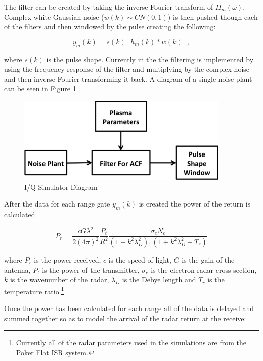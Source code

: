 \documentclass[10pt]{report}
\begin{document}
\noindent The filter can be created by taking the inverse Fourier transform of $H_m(\omega)$.  Complex white Gaussian noise  ($w(k)\sim CN(0,1)$) is then pushed though each of the filters and then windowed by the pulse creating the following:   

\begin{equation}
\label{eq2}
y_m (k)= s(k)\left[h_m(k)*w(k)\right],
\end{equation}
 
\noindent where $s(k)$ is the pulse shape.  Currently in the the filtering is implemented by using the frequency response of the filter and multiplying by the complex noise and then inverse Fourier transforming it back.  A diagram of a single noise plant can be seen in Figure \ref{fig:singlefilt}

\begin{figure}[!t]
\centering
\includegraphics[width=4in]{diagrampart}
\caption{I/Q Simulator Diagram}
\label{fig:singlefilt}
\end{figure}

After the data for each range gate $y_m(k)$ is created the power of the return is calculated

\begin{equation}
\label{eq3}
P_r = \frac{cG \lambda^2}{2(4\pi)^2}\frac{P_t }{R^2}\frac{\sigma_e N_e}{(1+k^2\lambda_D^2),(1+k^2\lambda_D^2 + T_r)}
\end{equation}
 
 \noindent where $P_r$ is the power received, $c$ is the speed of light, $G$ is the gain of the antenna, $P_t$ is the power of the transmitter, $\sigma_e$ is the electron radar cross section, $k$ is the wavenumber of the radar, $\lambda_D$ is the Debye length and $T_r$ is the temperature ratio.\footnote{Currently all of the radar parameters used in the simulations are from the Poker Flat ISR system.}
 
Once the power has been calculated for each range all of the data is delayed and summed together so as to model the arrival of the radar return at the receive: 
 
\end{document}
